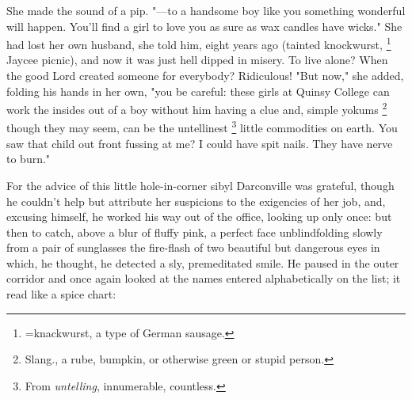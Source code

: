   She made the sound of a pip. 
"---to a handsome boy like you something wonderful
will happen. You'll find a girl to love you as sure as wax candles have wicks."
She had lost her own husband, she told him, eight years ago (tainted knockwurst,
\footnote{ =knackwurst, a type of German sausage.}
Jaycee picnic), and now it was just hell dipped in misery. To live alone? When
the good Lord created someone for everybody? Ridiculous! "But now," she added,
folding his hands in her own, "you be careful: these girls at Quinsy College can
work the insides out of a boy without him having a clue and, simple yokums
\footnote{ Slang., a rube, bumpkin, or otherwise green or stupid person.}
though they may seem, can be the untellinest 
\footnote{ \textdbend From \textit{untelling}, innumerable, countless.}
little commodities on earth. You saw that child out front fussing at me? I could 
have spit nails. They have nerve to burn."

  For the advice of this little hole-in-corner sibyl Darconville was grateful,
though he couldn't help but attribute her suspicions to the exigencies 
of her job, and, excusing himself, he worked his way out of the office, looking 
up only once: but then to catch, above a blur of fluffy 
pink, a perfect face unblindfolding slowly from a pair of sunglasses the 
fire-flash of two beautiful but dangerous eyes in which, he thought, he 
detected a sly, 
premeditated smile. He paused in the outer corridor and once again looked at 
the names entered alphabetically on the list; it read like a spice chart:
 
